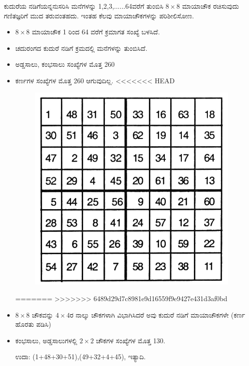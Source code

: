 ಕುದುರೆಯ ನಡಿಗೆಯನ್ನನುಸರಿಸಿ ಮನೆಗಳನ್ನು 1,2,3,......64ವರೆಗೆ ತುಂಬಿಸಿ $8 \times 8$ ಮಾಯಾಚೌಕ ರಚಿಸುವುದು ಗಣಿತಜ್ಞರಿಗೆ ಮುದ ತರುವಂತಹದು. ಇಂತಹ ಕೆಲವು ಮಾಯಾಚೌಕಗಳನ್ನು ಪರಿಶೀಲಿಸೋಣ.
\begin{itemize}
	\item $8 \times 8$ ಮಾಯಾಚೌಕ 1 ರಿಂದ 64 ವರೆಗೆ ಕ್ರಮಾಗತ ಸಂಖ್ಯೆ ಬಳಸಿದೆ.
	\item ಚದುರಂಗದ ಕುದುರೆ ನಡಿಗೆ ಕ್ರಮದಲ್ಲಿ ಮನೆಗಳನ್ನು ತುಂಬಿಸಿದೆ.
	\item ಅಡ್ಡಸಾಲು, ಕಂಭಸಾಲು ಸಂಖ್ಯೆಗಳ ಮೊತ್ತ 260
	\item ಕರ್ಣಗಳ ಸಂಖ್ಯೆಗಳ ಮೊತ್ತ 260 ಆಗುವುದಿಲ್ಲ.
<<<<<<< HEAD
	\begin{figure}[H]
	\includegraphics{src/figures/chap6/fig6-3.jpg}
	\end{figure}
=======
>>>>>>> 6489d29d7c8981e9d16559f9e9427e431d3af0bd
	\item $8 \times 8$ ಚೌಕವನ್ನು $4 \times 4$ರ ನಾಲ್ಕು ಚೌಕಗಳಾಗಿ ವಿಭಾಗಿಸಿದರೆ ಅವು ಕುದುರೆ ನಡಿಗೆ ಮಾಯಾಚೌಕಗಳೇ (ಕರ್ಣ ಹೊರತು ಪಡಿಸಿ)
	\item ಕಂಭಸಾಲು, ಅಡ್ಡಸಾಲುಗಳಲ್ಲಿ $2 \times 2$ ಚೌಕಗಳ ಸಂಖ್ಯೆಗಳ ಮೊತ್ತ 130.

	ಉದಾ: (1+48+30+51),(49+32+4+45), ಇತ್ಯಾದಿ.


\end{itemize}
